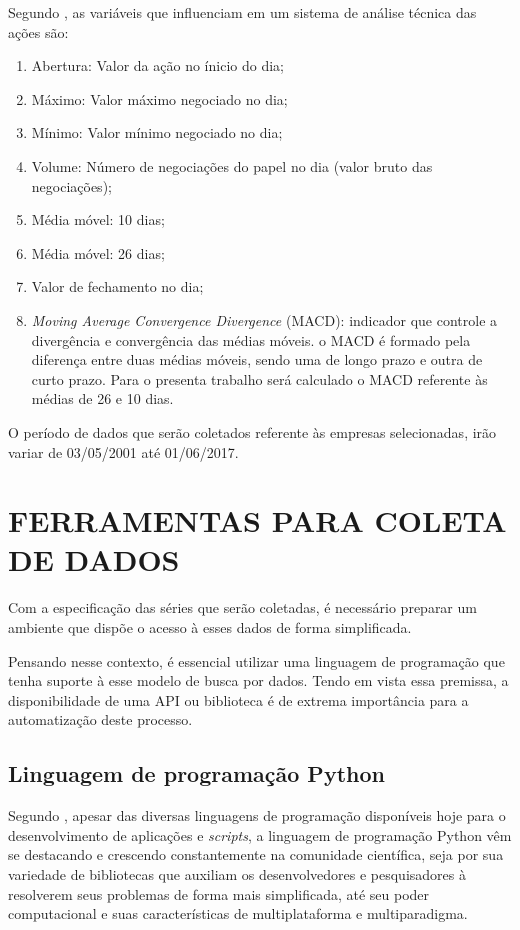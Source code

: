 Segundo , as variáveis que influenciam em um sistema de análise técnica das ações são:

\begin{enumerate}
\item Abertura: Valor da ação no ínicio do dia;
\item Máximo: Valor máximo negociado no dia;
\item Mínimo: Valor mínimo negociado no dia;
\item Volume: Número de negociações do papel no dia (valor bruto das negociações);
\item Média móvel: 10 dias;
\item Média móvel: 26 dias;
\item Valor de fechamento no dia;
\item \textit{Moving Average Convergence Divergence} (MACD): indicador que controle a divergência e convergência das médias móveis. o MACD é formado pela diferença entre duas médias móveis, sendo uma de longo prazo e outra de curto prazo. Para o presenta trabalho será calculado o MACD referente às médias de 26 e 10 dias.
\end{enumerate}

O período de dados que serão coletados referente às empresas selecionadas, irão variar de 03/05/2001 até 01/06/2017.

\section{FERRAMENTAS PARA COLETA DE DADOS}
Com a especificação das séries que serão coletadas, é necessário preparar um ambiente que dispõe o acesso à esses dados de forma simplificada. 

Pensando nesse contexto, é essencial utilizar uma linguagem de programação que tenha suporte à esse modelo de busca por dados. Tendo em vista essa premissa, a disponibilidade de uma API ou biblioteca é de extrema importância para a automatização deste processo.

\subsection{Linguagem de programação Python}
Segundo , apesar das diversas linguagens de programação disponíveis hoje para o desenvolvimento de aplicações e \textit{scripts}, a linguagem de programação Python vêm se destacando e crescendo constantemente na comunidade científica, seja por sua variedade de bibliotecas que auxiliam os desenvolvedores e pesquisadores à resolverem seus problemas de forma mais simplificada, até seu poder computacional e suas características de multiplataforma e multiparadigma.

